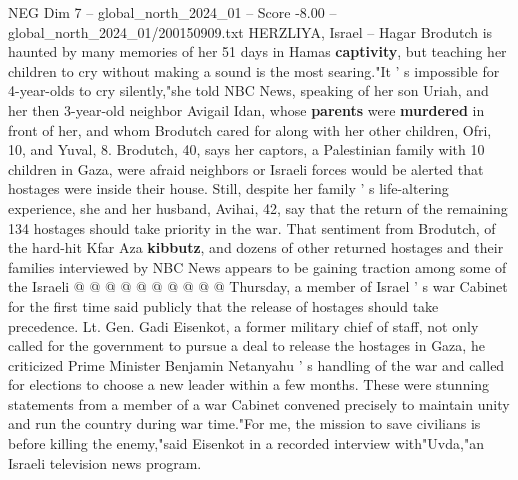 \begin{textsample}{NEG Dim 7 – global\_north\_2024\_01 – Score -8.00 – global\_north\_2024\_01/200150909.txt}  \label{ex:f7_neg_206}
HERZLIYA, Israel -- Hagar Brodutch is haunted by many memories of her 51 days in Hamas \textbf{captivity}, but teaching her children to cry without making a sound is the most searing."It ' s impossible for 4-year-olds to cry silently,"she told NBC News, speaking of her son Uriah, and her then 3-year-old neighbor Avigail Idan, whose \textbf{parents} were \textbf{murdered} in front of her, and whom Brodutch cared for along with her other children, Ofri, 10, and Yuval, 8.
Brodutch, 40, says her captors, a Palestinian family with 10 children in Gaza, were afraid neighbors or Israeli forces would be alerted that hostages were inside their house.
Still, despite her family ' s life-altering experience, she and her husband, Avihai, 42, say that the return of the remaining 134 hostages should take priority in the war.
That sentiment from Brodutch, of the hard-hit Kfar Aza \textbf{kibbutz}, and dozens of other returned hostages and their families interviewed by NBC News appears to be gaining traction among some of the Israeli @ @ @ @ @ @ @ @ @ @ Thursday, a member of Israel ' s war Cabinet for the first time said publicly that the release of hostages should take precedence.
Lt.
Gen.
Gadi Eisenkot, a former military chief of staff, not only called for the government to pursue a deal to release the hostages in Gaza, he criticized Prime Minister Benjamin Netanyahu ' s handling of the war and called for elections to choose a new leader within a few months.
These were stunning statements from a member of a war Cabinet convened precisely to maintain unity and run the country during war time."For me, the mission to save civilians is before killing the enemy,"said Eisenkot in a recorded interview with"Uvda,"an Israeli television news program.

\end{textsample}
